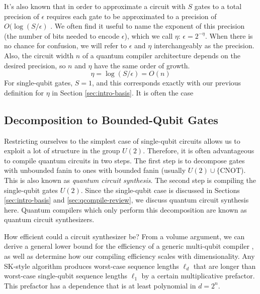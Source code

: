 It's also known that
in order to approximate a circuit with $S$ gates to a total precision of
$\epsilon$
requires each gate to be approximated to a precision of
$O(\log(S/\epsilon)$ \cite{Lloyd1995}. We often find it useful to name
the exponent of this precision (the number of bits needed to encode $\epsilon$),
which we call $\eta$: $\epsilon = 2^{-\eta}$.
When there is no chance for confusion, we will refer to $\epsilon$ and
$\eta$ interchangeably as the precision. Also, the circuit width $n$ of
a quantum compiler architecture depends on the desired precision, so
$n$ and $\eta$ have the same order of growth.
%
\begin{equation}
\eta = \log(S/\epsilon) = O(n)
\end{equation}
%
For
single-qubit gates, $S = 1$, and this corresponds exactly with our previous
definition for $\eta$ in Section \ref{sec:intro-basis}. It is often the
case 

\subsection{Decomposition to Bounded-Qubit Gates}
\label{subsec:qcompile-multi}

Restricting ourselves to the simplest case of
single-qubit circuits allows us to exploit a lot of structure
in the group $U(2)$. Therefore, it is often advantageous to compile
quantum circuits in two steps. The first step
is to decompose gates with unbounded
fanin to ones with bounded fanin (usually
$U(2) \cup \{\text{CNOT}$).
This is also known as \emph{quantum circuit synthesis}.
The second step is compiling the single-qubit gates $U(2)$.
Since the single-qubit case is discussed in Sections \ref{sec:intro-basis}
and \ref{sec:qcompile-review}, we discuss quantum circuit synthesis
here. Quantum compilers which only perform this decomposition are known
as quantum circuit synthesizers.

How efficient could a circuit synthesizer be?
From a volume argument, we can derive a general
lower bound for the efficiency of a generic multi-qubit compiler \cite{Harrow2002},
as well as determine how our compiling efficiency scales with dimensionality.
Any
SK-style algorithm produces worst-case sequence lengths $\ell_d$ that
are longer than worst-case single-qubit sequence lengths $\ell_1$ by a certain multiplicative
prefactor. This prefactor has a dependence that is at least
polynomial in $d = 2^n$. 

